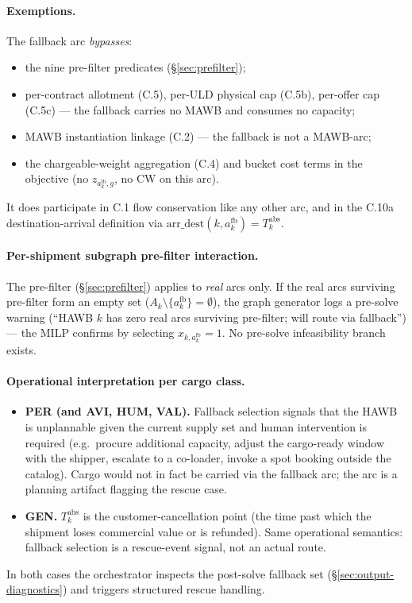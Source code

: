 \documentclass[11pt,a4paper]{article}
\theoremstyle{definition}
\begin{document}
\paragraph{Exemptions.}
The fallback arc \emph{bypasses}:
\begin{itemize}[noitemsep]
  \item the nine pre-filter predicates (\S\ref{sec:prefilter});
  \item per-contract allotment (C.5), per-ULD physical cap (C.5b), per-offer
        cap (C.5c) --- the fallback carries no MAWB and consumes no capacity;
  \item MAWB instantiation linkage (C.2) --- the fallback is not a MAWB-arc;
  \item the chargeable-weight aggregation (C.4) and bucket cost terms in the
        objective (no $z_{a^{\text{fb}}_k, g}$, no $\text{CW}$ on this arc).
\end{itemize}
It does participate in C.1 flow conservation like any other arc, and in the
C.10a destination-arrival definition via $\text{arr\_dest}(k, a^{\text{fb}}_k)
= T_k^{\text{abs}}$.

\paragraph{Per-shipment subgraph pre-filter interaction.}
The pre-filter (\S\ref{sec:prefilter}) applies to \emph{real} arcs only. If
the real arcs surviving pre-filter form an empty set ($A_k \setminus
\{a^{\text{fb}}_k\} = \emptyset$), the graph generator logs a pre-solve
warning (``HAWB $k$ has zero real arcs surviving pre-filter; will route via
fallback'') --- the MILP confirms by selecting $x_{k, a^{\text{fb}}_k} = 1$.
No pre-solve infeasibility branch exists.

\paragraph{Operational interpretation per cargo class.}
\begin{itemize}[noitemsep]
  \item \textbf{PER (and AVI, HUM, VAL).} Fallback selection signals that the
        HAWB is unplannable given the current supply set and human
        intervention is required (e.g.\ procure additional capacity, adjust
        the cargo-ready window with the shipper, escalate to a co-loader,
        invoke a spot booking outside the catalog). Cargo would not in fact
        be carried via the fallback arc; the arc is a planning artifact
        flagging the rescue case.
  \item \textbf{GEN.} $T_k^{\text{abs}}$ is the customer-cancellation point
        (the time past which the shipment loses commercial value or is
        refunded). Same operational semantics: fallback selection is a
        rescue-event signal, not an actual route.
\end{itemize}
In both cases the orchestrator inspects the post-solve fallback set
(\S\ref{sec:output-diagnostics}) and triggers structured rescue handling.
\end{document}
